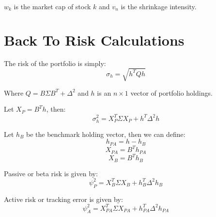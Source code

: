 \documentclass{article}
\begin{document}
\( w_k \) is the market cap of stock \( k \) and \( v_n \) is the shrinkage intensity. \\

\section*{Back To Risk Calculations}
The risk of the portfolio is simply:
\begin{equation}
\sigma_h = \sqrt{h^T Q h}
\end{equation}

Where \( Q = B \Sigma B^T + \Delta^2 \) and \( h \) is an \( n \times 1 \) vector of portfolio holdings.

Let \( X_P = B^T h \), then:
\begin{equation}
\sigma_h^2 = X_P^T \Sigma X_P + h^T \Delta^2 h
\end{equation}

Let \( h_B \) be the benchmark holding vector, then we can define:
\begin{equation}
h_{PA} = h - h_B
\end{equation}
\begin{equation}
X_{PA} = B^T h_{PA}
\end{equation}
\begin{equation}
X_B = B^T h_B
\end{equation}

Passive or beta risk is given by:
\begin{equation}
\psi_P^2 = X_B^T \Sigma X_B + h_B^T \Delta^2 h_B
\end{equation}

Active risk or tracking error is given by:
\begin{equation}
\psi_A^2 = X_{PA}^T \Sigma X_{PA} + h_{PA}^T \Delta^2 h_{PA}
\end{equation}
\end{document}
